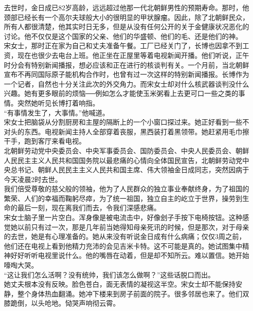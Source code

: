 去世时，金日成已82岁高龄，远远超过他那一代北朝鲜男性的预期寿命。那时，他颈部已经长有一个高尔夫球般大小的很明显的甲状腺瘤。因此，除了北朝鲜民众，所有人都很清楚，他其实时日无多，但是从没有任何公开的关于金健康状况恶化的讨论。他不仅仅是这个国家的父亲、他们的华盛顿、他们的毛、还是他们的神。\\

宋女士，那时正在家为自己和丈夫准备午餐。工厂已经关门了，长博也因拿不到工资，现在也很少去电台上班。他正坐在正屋里等着电视新闻开播。他们听说，正午时分会有特别新闻播报，想必应该和正在进行的核谈判有关。一个月前，当北朝鲜宣布不再同国际原子能机构合作时，也曾有过一次这样的特别新闻播报。长博作为一个记者，自然也十分关注此次的外交角力。而宋女士却对什么核武器谈判没什么兴趣。她有更多眼前的烦恼──例如怎么才能使玉米粥看上去更可口一些之类的事情。突然她听见长博打着响指。\\

“有事情发生了，大事情。”他喊道。\\

宋女士把脑袋从分割厨房和主屋的隔断上的一个小窗口探过来。她正好看到一些不对头的东西。电视新闻主持人全部穿着丧服，黑西装打着黑领带。她赶紧用毛巾擦干手，跑到客厅来看电视。\\

北朝鲜劳动党中央委员会、中央军事委员会、国防委员会、中央人民委员会、朝鲜人民民主主义人民共和国国务院以最悲痛的心情向全体国民宣告，北朝鲜劳动党中央总书记、朝鲜人民民主主义人民共和国主席、伟大领袖金日成同志，突然因病于今天凌晨2时去世。\\

我们倍受尊敬的慈父般的领袖，他为了人民群众的独立事业奉献终身，为了祖国的繁荣、人们的幸福而鞠躬尽瘁，为了统一祖国，独立自主的屹立于世界，操劳到生命的最后一刻，现在离我们而去，令我们深感悲痛。\\

宋女士脑子里一片空白。浑身像是被电流击中，好像刽子手按下电椅按钮。这种感觉她以前只有过一次，那是几年前当她得知母亲死讯的时候，但是那次，对于母亲的去世，她是有心理准备的。她从来没有听说金日成有什么病痛；仅仅3周之前，他们还在电视上看到他精力充沛的会见吉米卡特。这不可能是真的。她试图集中精神好好听听电视里说什么。他的嘴唇在动着，但是却不知所云。难以置信。她开始嚎啕大哭。\\

“这让我们怎么活啊？没有统帅，我们该怎么做啊？”这些话脱口而出。\\

她丈夫根本没有反映。脸色苍白，面无表情的凝视这半空。宋女士却不能保持安静，整个身体热血翻涌。她冲下楼来到房子前面的院子。很多邻居也来了。他们双膝跪倒，以头呛地。恸哭声响彻云霄。\\

